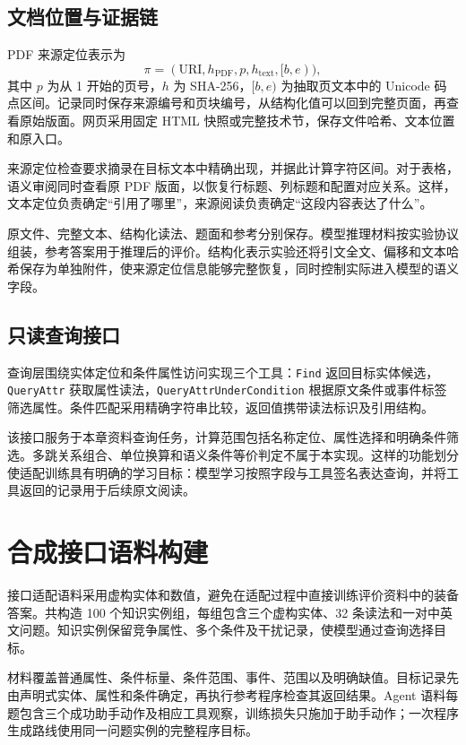 \subsection{文档位置与证据链}

PDF 来源定位表示为
\begin{equation}
 \pi=(\mathrm{URI},h_{\mathrm{PDF}},p,h_{\mathrm{text}},[b,e)),
\end{equation}
其中 $p$ 为从 1 开始的页号，$h$ 为 SHA-256，$[b,e)$ 为抽取页文本中的 Unicode 码点区间。记录同时保存来源编号和页块编号，从结构化值可以回到完整页面，再查看原始版面。网页采用固定 HTML 快照或完整技术节，保存文件哈希、文本位置和原入口。

来源定位检查要求摘录在目标文本中精确出现，并据此计算字符区间。对于表格，语义审阅同时查看原 PDF 版面，以恢复行标题、列标题和配置对应关系。这样，文本定位负责确定“引用了哪里”，来源阅读负责确定“这段内容表达了什么”。

原文件、完整文本、结构化读法、题面和参考分别保存。模型推理材料按实验协议组装，参考答案用于推理后的评价。结构化表示实验还将引文全文、偏移和文本哈希保存为单独附件，使来源定位信息能够完整恢复，同时控制实际进入模型的语义字段。

\subsection{只读查询接口}

查询层围绕实体定位和条件属性访问实现三个工具：\texttt{Find} 返回目标实体候选，\texttt{QueryAttr} 获取属性读法，\texttt{QueryAttrUnderCondition} 根据原文条件或事件标签筛选属性。条件匹配采用精确字符串比较，返回值携带读法标识及引用结构。

该接口服务于本章资料查询任务，计算范围包括名称定位、属性选择和明确条件筛选。多跳关系组合、单位换算和语义条件等价判定不属于本实现。这样的功能划分使适配训练具有明确的学习目标：模型学习按照字段与工具签名表达查询，并将工具返回的记录用于后续原文阅读。



\section{合成接口语料构建}

接口适配语料采用虚构实体和数值，避免在适配过程中直接训练评价资料中的装备答案。共构造 100 个知识实例组，每组包含三个虚构实体、32 条读法和一对中英文问题。知识实例保留竞争属性、多个条件及干扰记录，使模型通过查询选择目标。

材料覆盖普通属性、条件标量、条件范围、事件、范围以及明确缺值。目标记录先由声明式实体、属性和条件确定，再执行参考程序检查其返回结果。Agent 语料每题包含三个成功助手动作及相应工具观察，训练损失只施加于助手动作；一次程序生成路线使用同一问题实例的完整程序目标。

